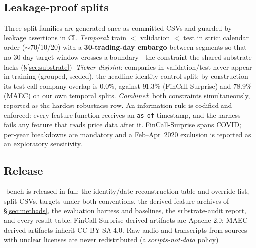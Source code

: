 \subsection{Leakage-proof splits}
\label{sec:splits}
Three split families are generated once as committed CSVs and guarded by
leakage assertions in CI. \emph{Temporal}: train $<$ validation $<$ test in strict
calendar order ($\sim$70/10/20) with a \textbf{30-trading-day embargo} between
segments so that no 30-day target window crosses a boundary---the constraint the
shared substrate lacks (\S\ref{sec:substrate}). \emph{Ticker-disjoint}: companies in
validation/test never appear in training (grouped, seeded), the headline
identity-control split; by construction its test-call company overlap is 0.0\%,
against 91.3\% (FinCall-Surprise) and 78.9\% (MAEC) on our own temporal splits.
\emph{Combined}: both constraints simultaneously, reported as the hardest
robustness row. An information rule is codified and enforced: every feature function
receives an \texttt{as\_of} timestamp, and the harness fails any feature that reads
price data after it. FinCall-Surprise spans COVID; per-year breakdowns are
mandatory and a Feb--Apr~2020 exclusion is reported as an exploratory sensitivity.

\subsection{Release}
\label{sec:release}
\ecvol-bench is released in full: the identity/date reconstruction table and
override list, split CSVs, targets under both conventions, the derived-feature
archives of \S\ref{sec:methods}, the evaluation harness and baselines, the
substrate-audit report, and every result table. FinCall-Surprise-derived artifacts
are Apache-2.0; MAEC-derived artifacts inherit CC-BY-SA-4.0. Raw audio and
transcripts from sources with unclear licenses are never redistributed (a
\emph{scripts-not-data} policy).
